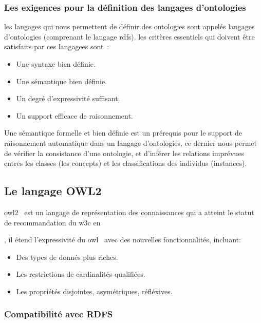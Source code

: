 \subsubsection{Les exigences pour la définition des langages
  d'ontologies}
\label{sec:semantic-web-owl-ontolgies-requirements}

les langages qui nous permettent de définir des ontologies sont
appelés langages d'ontologies (comprenant le langage \acrshort{rdfs}).
les critères essentiels qui doivent être satisfaits par ces langagees
sont~\cite{antoniou2012semantic}:

\SpecialItem
\begin{itemize}
\item Une syntaxe bien définie.
\item Une sémantique bien définie.
\item Un degré d'expressivité suffisant.
\item Un support efficace de raisonnement.\medskip
\end{itemize}
\enddescription

Une sémantique formelle et bien définie est un prérequis pour le
support de raisonnement automatique dans un langage d'ontologies, ce
dernier nous permet de vérifier la consistance d'une ontologie, et
d'inférer les relations imprévues entres les classes (les concepts) et
les classifications des individus (instances).\medskip

\subsection{Le langage OWL2}
\label{sec:semantic-web-owl-owl2}
\acrshort{owl2}~\cite{w3c2009owl} est un langage de représentation des
connaissances qui a atteint le statut de recommandation du
\acrshort{w3c} en \date{2009}, il étend l'expressivité du
\acrshort{owl}~\cite{mcguinness2004owl} avec des nouvelles
fonctionnalités, incluant:

\SpecialItem
\begin{itemize}
\item Des types de donnés plus riches.
\item Les restrictions de cardinalités qualifiées.
\item Les propriétés disjointes, asymétriques, réfléxives.
\end{itemize}
\enddescription

\subsubsection{Compatibilité avec RDFS}
\label{sec:semantic-web-owl-owl2-rdfs-compatibility}

